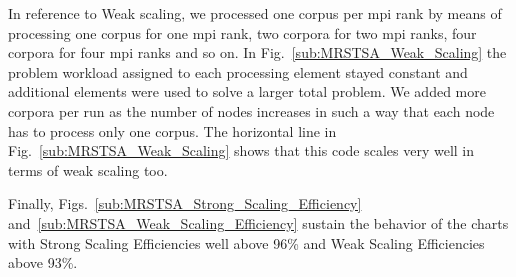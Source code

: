 \documentclass[10pt,journal,compsoc]{IEEEtran}
\begin{document}
In reference to Weak scaling, we processed one corpus per \gls{mpi} rank by means of processing one corpus for one \gls{mpi} rank, two corpora for two \gls{mpi} ranks, four corpora for four \gls{mpi} ranks and so on. In Fig.~\ref{sub:MRSTSA_Weak_Scaling} the problem workload assigned to each processing element stayed constant and additional elements were used to solve a larger total problem. We added more corpora per run as the number of nodes increases in such a way that each node has to process only one corpus. The horizontal line in Fig.~\ref{sub:MRSTSA_Weak_Scaling} shows that this code scales very well in terms of weak scaling too.

Finally, Figs.~\ref{sub:MRSTSA_Strong_Scaling_Efficiency} and~\ref{sub:MRSTSA_Weak_Scaling_Efficiency} sustain the behavior of the charts with Strong Scaling Efficiencies well above 96\% and Weak Scaling Efficiencies above 93\%.



\end{document}
